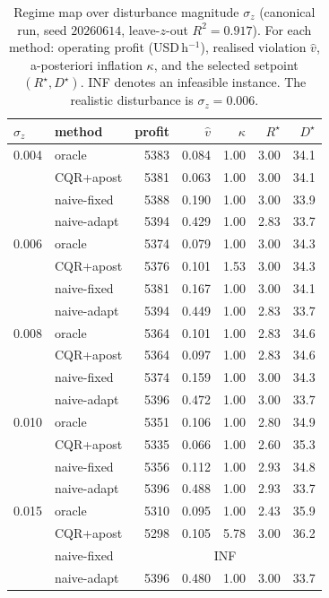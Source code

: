 \begin{table}[t]
\centering
\caption{Regime map over disturbance magnitude $\sigma_z$ (canonical run, seed $20260614$,
leave-$z$-out $R^2=0.917$). For each method: operating profit (USD\,h$^{-1}$), realised violation
$\hat v$, a-posteriori inflation $\kappa$, and the selected setpoint $(R^\star,D^\star)$. INF
denotes an infeasible instance. The realistic disturbance is $\sigma_z=0.006$.}
\label{tab:regime}
\footnotesize
\begin{tabular}{llrrrrr}
\toprule
$\sigma_z$ & method & profit & $\hat v$ & $\kappa$ & $R^\star$ & $D^\star$ \\
\midrule
0.004 & oracle      & 5383 & 0.084 & 1.00 & 3.00 & 34.1 \\
      & CQR+apost   & 5381 & 0.063 & 1.00 & 3.00 & 34.1 \\
      & naive-fixed & 5388 & 0.190 & 1.00 & 3.00 & 33.9 \\
      & naive-adapt & 5394 & 0.429 & 1.00 & 2.83 & 33.7 \\
\midrule
0.006 & oracle      & 5374 & 0.079 & 1.00 & 3.00 & 34.3 \\
      & CQR+apost   & 5376 & 0.101 & 1.53 & 3.00 & 34.3 \\
      & naive-fixed & 5381 & 0.167 & 1.00 & 3.00 & 34.1 \\
      & naive-adapt & 5394 & 0.449 & 1.00 & 2.83 & 33.7 \\
\midrule
0.008 & oracle      & 5364 & 0.101 & 1.00 & 2.83 & 34.6 \\
      & CQR+apost   & 5364 & 0.097 & 1.00 & 2.83 & 34.6 \\
      & naive-fixed & 5374 & 0.159 & 1.00 & 3.00 & 34.3 \\
      & naive-adapt & 5396 & 0.472 & 1.00 & 3.00 & 33.7 \\
\midrule
0.010 & oracle      & 5351 & 0.106 & 1.00 & 2.80 & 34.9 \\
      & CQR+apost   & 5335 & 0.066 & 1.00 & 2.60 & 35.3 \\
      & naive-fixed & 5356 & 0.112 & 1.00 & 2.93 & 34.8 \\
      & naive-adapt & 5396 & 0.488 & 1.00 & 2.93 & 33.7 \\
\midrule
0.015 & oracle      & 5310 & 0.095 & 1.00 & 2.43 & 35.9 \\
      & CQR+apost   & 5298 & 0.105 & 5.78 & 3.00 & 36.2 \\
      & naive-fixed & \multicolumn{5}{c}{INF} \\
      & naive-adapt & 5396 & 0.480 & 1.00 & 3.00 & 33.7 \\

\end{tabular}
\end{table}
